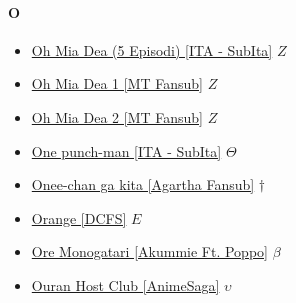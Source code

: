 		\paragraph{O} \hypertarget{SO}{}
			\begin{itemize}
				\item \href{https://mega.nz/#F!8BoFEI5Y!jCLTPQ4AIMzY0aG4TZTZGQ} {Oh Mia Dea (5 Episodi) [ITA - SubIta]} $Z$ \\ 
				\item \href{https://mega.nz/#F!8RRxxQRS!BGxlQQwThaiLYd7mOFI_Vg} {Oh Mia Dea 1 [MT Fansub]}  $Z$ \\
				\item \href{https://mega.nz/#F!odoWDDAI!hfw2DziJ4MVEeqjLuBaEQg} {Oh Mia Dea 2 [MT Fansub]}  $Z$ \\
				\item \href{https://mega.nz/#F!8SpGDKiR!Nr4NNthcRd6Bc4Oks6IFUg} {One punch-man [ITA - SubIta]}  $\varTheta$ \\
				\item \href{https://mega.nz/#F!vOAzFI6I!GTXUOISCn9-ne6caK0rDzQ} {Onee-chan ga kita [Agartha Fansub]}  $\dag$ \\
				\item \href{https://mega.nz/#F!J1BFiYCB!LgE85_Tfh2IYcthdJLIJbg} {Orange [DCFS]}  $E$ \\ 
				\item \href{https://mega.nz/#F!e1wgiZDD!-gQcNf8WKwru196K49Ergw} {Ore Monogatari [Akummie Ft. Poppo]}  $\beta$ \\ 
				\item \href{https://mega.nz/#F!38EDwZIJ!g6Ydcapzz38BFsNOpazVjA} {Ouran Host Club [AnimeSaga]}  $\upsilon$ \\ 
			
			\end{itemize}
		
